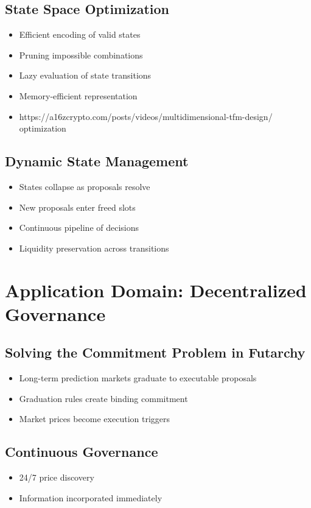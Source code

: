 \documentclass{article}
\begin{document}
\subsection{State Space Optimization}
\begin{itemize}
    \item Efficient encoding of valid states
    \item Pruning impossible combinations
    \item Lazy evaluation of state transitions
    \item Memory-efficient representation
    \item https://a16zcrypto.com/posts/videos/multidimensional-tfm-design/ optimization
\end{itemize}

\subsection{Dynamic State Management}
\begin{itemize}
    \item States collapse as proposals resolve
    \item New proposals enter freed slots
    \item Continuous pipeline of decisions
    \item Liquidity preservation across transitions
\end{itemize}

\section{Application Domain: Decentralized Governance}
\subsection{Solving the Commitment Problem in Futarchy}
\begin{itemize}
   \item Long-term prediction markets graduate to executable proposals
   \item Graduation rules create binding commitment
   \item Market prices become execution triggers
\end{itemize}

\subsection{Continuous Governance }
\begin{itemize}
   \item 24/7 price discovery
   \item Information incorporated immediately
\end{itemize}
\end{document}
